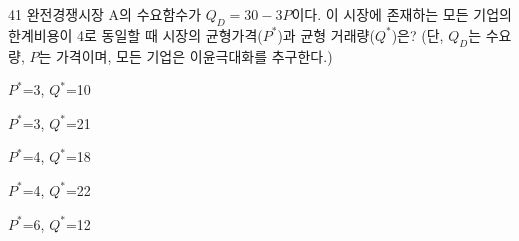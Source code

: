 \begin{question}{41}
완전경쟁시장 A의 수요함수가 $Q_{ D } =30-3P$이다. 이 시장에 존재하는 모든 기업의 한계비용이 4로 동일할 때 시장의 균형가격($P^{ * }$)과 균형 거래량($Q^{ * }$)은? (단, $Q_{ D }$는 수요량, $P$는 가격이며, 모든 기업은 이윤극대화를 추구한다.)
\begin{choices}
  \item $P^{ * }$=3, $Q^{ * }$=10
  \item $P^{ * }$=3, $Q^{ * }$=21
  \item $P^{ * }$=4, $Q^{ * }$=18
  \item $P^{ * }$=4, $Q^{ * }$=22
  \item $P^{ * }$=6, $Q^{ * }$=12
\end{choices}
\end{question}
